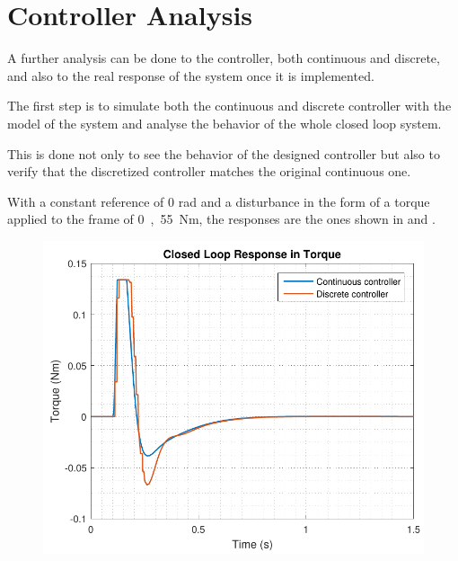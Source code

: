 \section{Controller Analysis}\label{ssec:ControllerVerification}
A further analysis can be done to the controller, both continuous and discrete, and also to the real response of the system once it is implemented.

The first step is to simulate both the continuous and discrete controller with the model of the system and analyse the behavior of the whole closed loop system.

This is done not only to see the behavior of the designed controller but also to verify that the discretized controller matches the original continuous one. 

With a constant reference of 0 rad and a disturbance in the form of a torque applied to the frame of \si{0,55 Nm}, the responses are the ones shown in  and .
%
\begin{minipage}{0.45\linewidth}
	\begin{figure}[H]
      \includegraphics[scale=.53]{figures/torqueComp}
      \captionsetup{justification=centering}
      \label{discreteVsContinuousOutputController}
    \end{figure}\vspace{-5mm}
\end{minipage}
